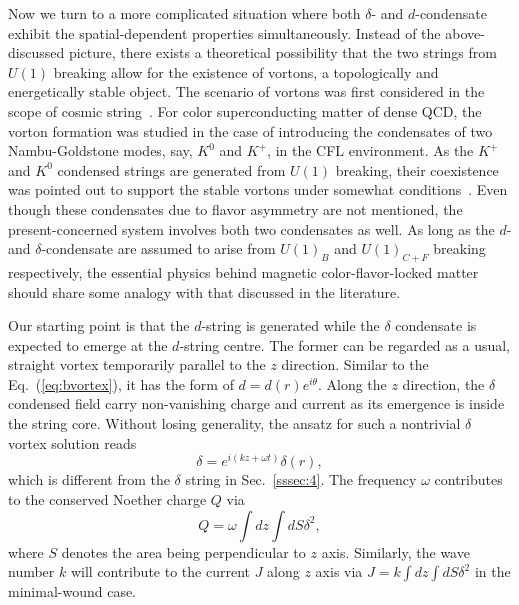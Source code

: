 \documentclass[prd, showpacs,nofootinbib,amsmath,amssymb]{revtex4}
\begin{document}
Now we turn to a more complicated situation where both $\delta$- and $d$-condensate exhibit the
spatial-dependent properties simultaneously. Instead of the above-discussed picture, there exists a
theoretical possibility that the two strings from $U(1)$ breaking allow for the existence of vortons,
a topologically and energetically stable object. The scenario of vortons was first considered in the
scope of cosmic
string~\cite{vilenkin2000cosmic,witten1985superconducting,davis1988physics1,davis1988physics2,haws1988superconducting}.
For color superconducting matter of dense QCD, the vorton formation was studied in the case of introducing the
condensates of two Nambu-Goldstone modes, say, $K^0$ and $K^+$, in the CFL environment. As the $K^+$ and $K^0$ condensed strings are generated from $U(1)$ breaking, their coexistence was pointed out to support the stable vortons under somewhat conditions~\cite{kaplan2002charged,buckley2002superconducting}. 
Even though these condensates due to flavor asymmetry are not mentioned, the present-concerned system involves both two condensates as well. As long as the $d$- and
$\delta$-condensate are assumed to arise from $U(1)_B$ and $U(1)_{C+F}$ breaking respectively, the essential physics
behind magnetic color-flavor-locked matter should share some analogy with that discussed in the literature.
%

Our starting point is that the $d$-string is generated while the $\delta$ condensate is expected to emerge
at the $d$-string centre. The former can be regarded as a usual, straight vortex temporarily parallel to the
$z$ direction. Similar to the Eq.~(\ref{eq:bvortex}), it has the form of $d = d(r)e^{i\theta}$.
Along the $z$ direction, the $\delta$ condensed field carry non-vanishing charge and current as its emergence
is inside the string core. Without losing generality, the ansatz for such a nontrivial $\delta$ vortex solution reads
\begin{equation}
  \label{eq:delta}
  \delta =  e^{i(kz+\omega t)}\delta(r),
\end{equation}
which is different from the $\delta$ string in Sec.~\ref{sssec:4}. The frequency $\omega$ contributes to the conserved
Noether charge $Q$ via
 \begin{equation}
  \label{eq:vortonquantumq}
   Q = \omega\int dz \int dS \delta^2,
 \end{equation}
where $S$ denotes the area being perpendicular to $z$ axis. Similarly, the wave number $k$ will contribute to the
current $J$ along $z$ axis via $J =k\int dz \int dS \delta^2$ in the minimal-wound case.
\end{document}
